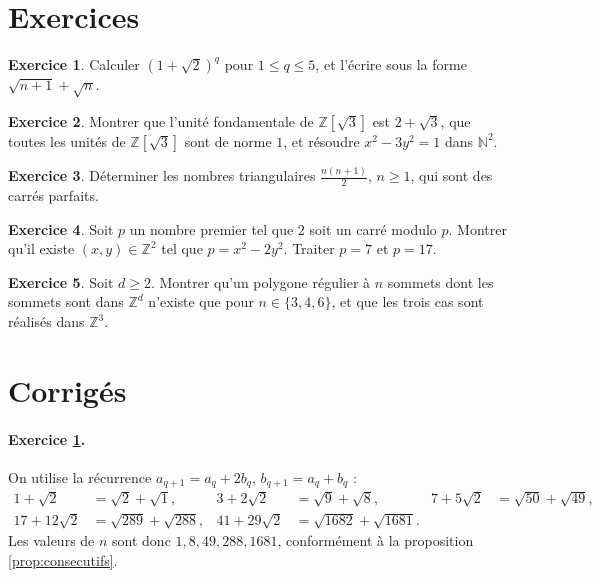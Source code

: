 \documentclass[11pt,a4paper]{article}
\theoremstyle{plain}
\theoremstyle{definition}
\newtheorem{exercice}{Exercice}
\theoremstyle{remark}
\newcommand{\N}{\mathbb{N}}
\newcommand{\Z}{\mathbb{Z}}
\begin{document}
\section{Exercices}

\begin{exercice}\label{exo:puissances}
Calculer $(1+\sqrt2)^q$ pour $1\leq q\leq5$, et l'écrire sous la forme $\sqrt{n+1}+\sqrt n$.
\end{exercice}

\begin{exercice}\label{exo:z3}
Montrer que l'unité fondamentale de $\Z[\sqrt3]$ est $2+\sqrt3$, que toutes les unités de $\Z[\sqrt3]$ sont de norme $1$, et résoudre $x^2-3y^2=1$ dans $\N^2$.
\end{exercice}

\begin{exercice}\label{exo:triangulaires}
Déterminer les nombres triangulaires $\frac{n(n+1)}2$, $n\geq1$, qui sont des carrés parfaits.
\end{exercice}

\begin{exercice}\label{exo:premiers}
Soit $p$ un nombre premier tel que $2$ soit un carré modulo $p$. Montrer qu'il existe $(x,y)\in\Z^2$ tel que $p=x^2-2y^2$. Traiter $p=7$ et $p=17$.
\end{exercice}

\begin{exercice}\label{exo:zd}
Soit $d\geq2$. Montrer qu'un polygone régulier à $n$ sommets dont les sommets sont dans $\Z^d$ n'existe que pour $n\in\{3,4,6\}$, et que les trois cas sont réalisés dans $\Z^3$.
\end{exercice}

\section{Corrigés}

\paragraph{Exercice \ref{exo:puissances}.} On utilise la récurrence $a_{q+1}=a_q+2b_q$, $b_{q+1}=a_q+b_q$ :
\[
\begin{aligned}
1+\sqrt2&=\sqrt2+\sqrt1, & 3+2\sqrt2&=\sqrt9+\sqrt8, & 7+5\sqrt2&=\sqrt{50}+\sqrt{49},\\
17+12\sqrt2&=\sqrt{289}+\sqrt{288}, & 41+29\sqrt2&=\sqrt{1682}+\sqrt{1681}.
\end{aligned}
\]
Les valeurs de $n$ sont donc $1,8,49,288,1681$, conformément à la proposition \ref{prop:consecutifs}.
\end{document}
